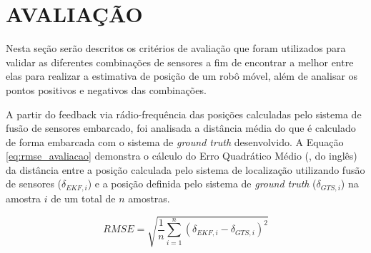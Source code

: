 \documentclass[acronym, symbols, table]{fei}
\begin{document}
%		
%		
%		
		
	\section{AVALIAÇÃO}\label{sec:metodologia_avaliacao}
	
		Nesta seção serão descritos os critérios de avaliação que foram utilizados para validar as diferentes combinações de sensores a fim de encontrar a melhor entre elas para realizar a estimativa de posição de um robô móvel, além de analisar os pontos positivos e negativos das combinações.
		
		A partir do feedback via rádio-frequência das posições calculadas pelo sistema de fusão de sensores embarcado, foi analisada a distância média do que é calculado de forma embarcada com o sistema de \textit{ground truth} desenvolvido. A Equação \eqref{eq:rmse_avaliacao} demonstra o cálculo do Erro Quadrático Médio (, do inglês) da distância entre a posição calculada pelo sistema de localização utilizando fusão de sensores ($\delta_{EKF, i}$) e a posição definida pelo sistema de \textit{ground truth} ($\delta_{GTS, i}$) na amostra $i$ de um total de $n$ amostras.
		
		\begin{equation}\label{eq:rmse_avaliacao}
			RMSE = \sqrt{\frac{1}{n}\sum_{i=1}^{n}(\delta_{EKF, i} - \delta_{GTS, i})^{2}}
		\end{equation}
	
\end{document}
